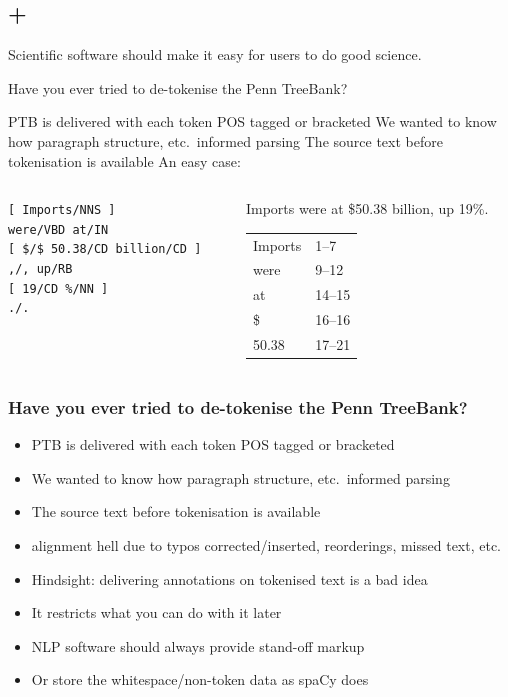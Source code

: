 \documentclass[aspectratio=169, 22pt]{beamer}
\newcommand{\hl}{\textcolor{usydred}}
\newcommand{\ex}{\textcolor{usydblue}}
\newenvironment{sectionslide}
			{\subsection*{+}\begin{frame}[fragile,environment=sectionslide]\vfill\begin{center}\Large}
			{\end{center}\vfill\end{frame}}
\begin{document}
\begin{sectionslide}
Scientific software should make it easy for users to do good science.
\end{sectionslide}

\begin{plain}{Have you ever tried to de-tokenise the Penn TreeBank?}
	\begin{itemize}
	\p PTB is delivered with each token POS tagged or bracketed
	\p We wanted to know how paragraph structure, etc.\ informed parsing
	\p The source text before tokenisation is available
	\p An easy case:
	\end{itemize}
	\begin{columns}\hspace{.05\textwidth}\begin{column}{.3\textwidth}
		{		\color{usydblue}
\verb|[ Imports/NNS ]|\\
\verb|were/VBD at/IN|\\
\verb|[ $/$ 50.38/CD billion/CD ]|\\
\verb|,/, up/RB|\\
\verb|[ 19/CD %/NN ]|\\
\verb|./.|}
\end{column}
	\begin{column}{.3\textwidth}
		\ex{Imports were at \$50.38 billion, up 19\%.}\\
		\vspace*{1em}
	{\small
	\begin{tabular}{ll}
		Imports & 1--7 \\
		were & 9--12 \\
		at & 14--15 \\
		\$ & 16--16 \\
		50.38 & 17--21 \\
	\end{tabular}
	}
\end{column}\end{columns}
\end{plain}

\begin{frame}\frametitle{Have you ever tried to de-tokenise the Penn TreeBank?}
\newcommand\p\item
	\begin{itemize}
	\p PTB is delivered with each token POS tagged or bracketed
	\p We wanted to know how paragraph structure, etc.\ informed parsing
	\p The source text before tokenisation is available
	\p[$\Rightarrow$] \hl{alignment hell} due to typos corrected/inserted, reorderings, missed text, etc.
	\vfill
	\p Hindsight: delivering annotations on tokenised text is a bad idea
	\p It restricts what you can do with it later
	\p NLP software should always provide stand-off markup
	\p Or store the whitespace/non-token data as spaCy does
	\end{itemize}
\end{frame}
\end{document}
